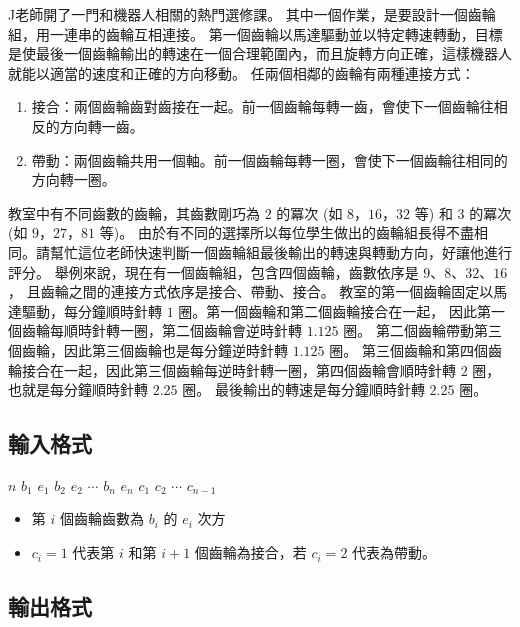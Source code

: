 J老師開了一門和機器人相關的熱門選修課。
其中一個作業，是要設計一個齒輪組，用一連串的齒輪互相連接。
第一個齒輪以馬達驅動並以特定轉速轉動，目標是使最後一個齒輪輸出的轉速在一個合理範圍內，而且旋轉方向正確，這樣機器人就能以適當的速度和正確的方向移動。
任兩個相鄰的齒輪有兩種連接方式：

\begin{enumerate}
\def\labelenumi{\arabic{enumi}.}
\tightlist
\item
  接合：兩個齒輪齒對齒接在一起。前一個齒輪每轉一齒，會使下一個齒輪往相反的方向轉一齒。
\item
  帶動：兩個齒輪共用一個軸。前一個齒輪每轉一圈，會使下一個齒輪往相同的方向轉一圈。
\end{enumerate}

教室中有不同齒數的齒輪，其齒數剛巧為 \(2\) 的冪次 (如
\(8\)，\(16\)，\(32\) 等) 和 \(3\) 的冪次 (如 \(9\)，\(27\)，\(81\)
等)。
由於有不同的選擇所以每位學生做出的齒輪組長得不盡相同。請幫忙這位老師快速判斷一個齒輪組最後輸出的轉速與轉動方向，好讓他進行評分。
舉例來說，現在有一個齒輪組，包含四個齒輪，齒數依序是
\(9\)、\(8\)、\(32\)、\(16\)，
且齒輪之間的連接方式依序是接合、帶動、接合。
教室的第一個齒輪固定以馬達驅動，每分鐘順時針轉 \(1\)
圈。第一個齒輪和第二個齒輪接合在一起，
因此第一個齒輪每順時針轉一圈，第二個齒輪會逆時針轉 \(1.125\) 圈。
第二個齒輪帶動第三個齒輪，因此第三個齒輪也是每分鐘逆時針轉 \(1.125\)
圈。
第三個齒輪和第四個齒輪接合在一起，因此第三個齒輪每逆時針轉一圈，第四個齒輪會順時針轉
\(2\) 圈，也就是每分鐘順時針轉 \(2.25\) 圈。
最後輸出的轉速是每分鐘順時針轉 \(2.25\) 圈。

\subsection{輸入格式}

\begin{format}
\f{
$n$
$b_1$ $e_1$ $b_2$ $e_2$ $\cdots$ $b_n$ $e_n$
$c_1$ $c_2$ $\cdots$ $c_{n-1}$
}
\end{format}

\begin{itemize}
\tightlist
\item
  第 \(i\) 個齒輪齒數為 \(b_i\) 的 \(e_i\) 次方
\item
  \(c_i = 1\) 代表第 \(i\) 和第 \(i+1\) 個齒輪為接合，若 \(c_i = 2\)
  代表為帶動。
\end{itemize}

\subsection{輸出格式}

